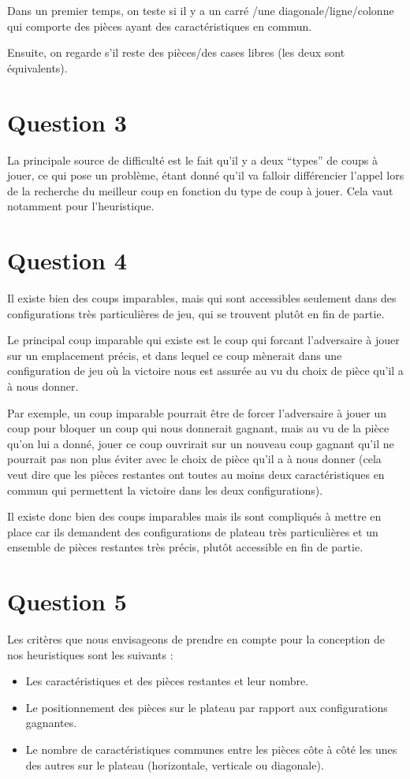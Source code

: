 \documentclass{article}
\begin{document}
Dans un premier temps, on teste si il y a un carr\'e /une
diagonale/ligne/colonne qui comporte des pi\`eces ayant des
caract\'eristiques en commun.


Ensuite, on regarde s'il reste des pi\`eces/des cases
libres (les deux sont \'equivalents). 

\section{Question 3}
La principale source de difficult\'e est le fait qu'il y a deux ``types'' de coups \`a jouer, ce qui
pose un probl\`eme, \'etant donn\'e qu'il va falloir diff\'erencier l'appel
lors de la recherche du meilleur coup en fonction du type de coup
\`a jouer. Cela vaut notamment pour l'heuristique.

\section{Question 4}
Il existe bien des coups imparables, mais qui sont accessibles seulement dans des configurations tr\`es
particuli\`eres de jeu, qui se trouvent plut\^ot en fin de partie.


Le principal coup imparable qui existe est le coup qui forcant l'adversaire \`a jouer sur un
emplacement pr\'ecis, et dans lequel ce coup m\`enerait dans une
configuration de jeu o\`u la victoire nous est assur\'ee au
vu du choix de pi\`ece qu'il a \`a nous donner.


Par exemple, un coup imparable pourrait \^etre de forcer l'adversaire \`a jouer un coup pour bloquer un
coup qui nous donnerait gagnant, mais au vu de la pi\`ece qu'on lui a donn\'e, jouer ce coup ouvrirait
sur un nouveau coup gagnant qu'il ne pourrait pas non plus \'eviter avec le choix de pi\`ece qu'il a \`a
nous donner (cela veut dire que les pi\`eces restantes ont toutes au moins deux caract\'eristiques en
commun qui permettent la victoire dans les deux configurations).


Il existe donc bien des coups imparables mais ils sont compliqu\'es \`a mettre en place car ils demandent des
configurations de plateau tr\`es particuli\`eres et un ensemble de pi\`eces restantes tr\`es pr\'ecis, plut\^ot
accessible en fin de partie.



\section{Question 5}
Les crit\`eres que nous envisageons de prendre en compte pour la conception de nos heuristiques sont les
suivants :
\begin{itemize}
\item Les caract\'eristiques et des pi\`eces restantes et leur nombre.
\item Le positionnement des pi\`eces sur le plateau par rapport aux configurations gagnantes.
\item Le nombre de caract\'eristiques communes entre les pi\`eces c\^ote \`a c\^ot\'e les unes des autres sur
le plateau (horizontale, verticale ou diagonale).
\end{itemize}
\end{document}
